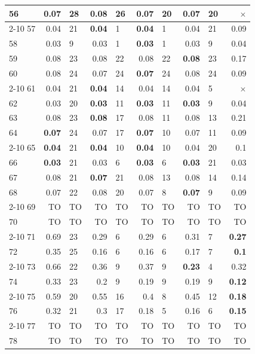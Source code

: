 \begin{longtable}{lr@{\hskip 4pt}l@{\hskip 12pt}r@{\hskip 4pt}l@{\hskip 12pt}r@{\hskip 4pt}l@{\hskip 12pt}r@{\hskip 4pt}l@{\hskip 12pt}r}
56 & 0.07 & 28 & 0.08 & 26 & \textbf{0.07} & 20 & \textbf{0.07} & 20 & $\times$ \\
\cmidrule{2-10}
57 & 0.04 & 21 & \textbf{0.04} & 1 & \textbf{0.04} & 1 & 0.04 & 21 & 0.09 \\
58 & 0.03 & 9 & 0.03 & 1 & \textbf{0.03} & 1 & 0.03 & 9 & 0.04 \\
59 & 0.08 & 23 & 0.08 & 22 & 0.08 & 22 & \textbf{0.08} & 23 & 0.17 \\
60 & 0.08 & 24 & 0.07 & 24 & \textbf{0.07} & 24 & 0.08 & 24 & 0.09 \\
\cmidrule{2-10}
61 & 0.04 & 21 & \textbf{0.04} & 14 & 0.04 & 14 & 0.04 & 5 & $\times$ \\
62 & 0.03 & 20 & \textbf{0.03} & 11 & \textbf{0.03} & 11 & \textbf{0.03} & 9 & 0.04 \\
63 & 0.08 & 23 & \textbf{0.08} & 17 & 0.08 & 11 & 0.08 & 13 & 0.21 \\
64 & \textbf{0.07} & 24 & 0.07 & 17 & \textbf{0.07} & 10 & 0.07 & 11 & 0.09 \\
\cmidrule{2-10}
65 & \textbf{0.04} & 21 & \textbf{0.04} & 10 & \textbf{0.04} & 10 & 0.04 & 20 & 0.1 \\
66 & \textbf{0.03} & 21 & 0.03 & 6 & \textbf{0.03} & 6 & \textbf{0.03} & 21 & 0.03 \\
67 & 0.08 & 21 & \textbf{0.07} & 21 & 0.08 & 13 & 0.08 & 14 & 0.14 \\
68 & 0.07 & 22 & 0.08 & 20 & 0.07 & 8 & \textbf{0.07} & 9 & 0.09 \\
\cmidrule{2-10}
69 & TO & TO & TO & TO & TO & TO & TO & TO & TO \\
70 & TO & TO & TO & TO & TO & TO & TO & TO & TO \\
\cmidrule{2-10}
71 & 0.69 & 23 & 0.29 & 6 & 0.29 & 6 & 0.31 & 7 & \textbf{0.27} \\
72 & 0.35 & 25 & 0.16 & 6 & 0.16 & 6 & 0.17 & 7 & \textbf{0.1} \\
\cmidrule{2-10}
73 & 0.66 & 22 & 0.36 & 9 & 0.37 & 9 & \textbf{0.23} & 4 & 0.32 \\
74 & 0.33 & 23 & 0.2 & 9 & 0.19 & 9 & 0.19 & 9 & \textbf{0.12} \\
\cmidrule{2-10}
75 & 0.59 & 20 & 0.55 & 16 & 0.4 & 8 & 0.45 & 12 & \textbf{0.18} \\
76 & 0.32 & 21 & 0.3 & 17 & 0.18 & 5 & 0.16 & 6 & \textbf{0.15} \\
\cmidrule{2-10}
77 & TO & TO & TO & TO & TO & TO & TO & TO & TO \\
78 & TO & TO & TO & TO & TO & TO & TO & TO & TO \\

\end{longtable}
